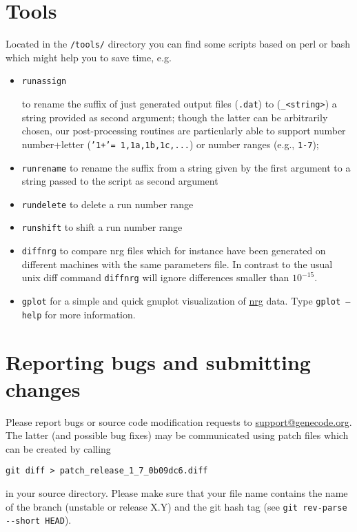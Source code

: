 \documentclass[12pt]{article}
\begin{document}
\section{Tools}\label{sec:tools}
Located in the \texttt{/tools/} directory you can find some
scripts based on perl or bash which might help you to save time, e.g.
\begin{itemize}
\item \hypertarget{runassign}{{\tt runassign}} to rename the suffix of just
generated \gene output files ({\tt *.dat}) to ({\tt *\_<string>}) a string
provided as second argument; though the latter can be arbitrarily chosen,
our post-processing routines are particularly able to support number
number+letter ({\tt '1+'= 1,1a,1b,1c,...}) or number ranges (e.g., {\tt 1-7});
\item \texttt{runrename} to rename the suffix from a string given by the
first argument to a string passed to the script as second argument
\item \texttt{rundelete} to delete a run number range
\item \texttt{runshift} to shift a run number range
\item \texttt{diffnrg} to compare nrg files which for instance
 have been generated on different machines with the same parameters file.
In contrast to the usual unix diff command \texttt{diffnrg} will ignore
differences smaller than $10^{-15}$.
\item \texttt{gplot} for a simple and quick gnuplot visualization of
\hyperref[subsec:nrg-file]{nrg} data. Type \texttt{gplot --help} for more
information.
\end{itemize}

\newpage
\section{Reporting bugs and submitting changes}
Please report bugs or source code modification requests to
\href{mailto:support@genecode.org}{support@genecode.org}.
The latter (and possible bug fixes) may be communicated using
patch files which can be created by calling
\begin{verbatim}
git diff > patch_release_1_7_0b09dc6.diff
\end{verbatim}
in your \gene source directory. Please make sure that your
file name contains the name of the branch (unstable or
release X.Y) and the git hash tag (see \verb|git rev-parse --short HEAD|).


\end{document}
